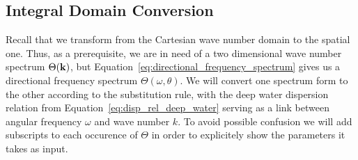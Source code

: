 \subsection{Integral Domain Conversion}
%
Recall that we transform from the Cartesian wave number domain to the spatial 
one. Thus, as a prerequisite, we are in need of a two dimensional wave number 
spectrum $\Theta(\mathbf{k})$, but 
Equation~\ref{eq:directional_frequency_spectrum} 
gives us a directional frequency spectrum $\Theta(\omega,\theta)$. We will 
convert one spectrum form to the other according to the substitution rule, with 
the deep water dispersion relation from Equation~\ref{eq:disp_rel_deep_water} 
serving as a link between angular frequency $\omega$ and wave number $k$. To 
avoid possible confusion we will add subscripts to each occurence of $\Theta$ 
in order to explicitely show the parameters it takes as input.\\

